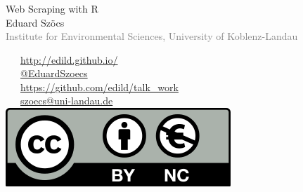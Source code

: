 \documentclass[12pt, t]{beamer}
\begin{document}
\begin{frame}
    \frametitle{}
    \vspace{1em}
    \begin{centering}
    \Large \textcolor{title}{Web Scraping with R} \\[1em]
        Eduard Szöcs \\[0.3em]
    \tiny \textcolor{gray}{Institute for Environmental Sciences, University of Koblenz-Landau} \\[5em]
    \end{centering}
    \normalsize
    \textcolor{hilight}{\faLaptop}~~~\href{http://edild.github.io/}{http://edild.github.io/ }\\[.5em]
    \textcolor{hilight}{\faTwitter}~~~\href{http://twitter.com/EduardSzoecs}{@EduardSzoecs}     \\[0.5em]
    \textcolor{hilight}{\faGift}~~~\href{https://github.com/edild/talk_webscraping}{https://github.com/edild/talk\_work}\\[0.5em]
    \textcolor{hilight}{\faEnvelope}~~~\href{mailto:szoecs@uni-landau.de}{szoecs@uni-landau.de} \\[.5em]
    \hfill \includegraphics[width =.3\textwidth]{fig/Cc-by-nc_euro_icon.png} 
\end{frame}
\end{document}
